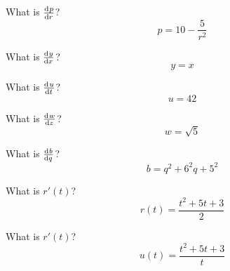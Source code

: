 \begin{ProblemSet}
 \begin{Problem}
  What is $\frac{\mathrm{d}^{{}}p}{\mathrm{d} r^{{}}}$?
  \begin{equation*}
   p = 10 - \frac{5}{r^2}
  \end{equation*}
 \end{Problem}

 \begin{Problem}
  What is $\frac{\mathrm{d}^{{}}y}{\mathrm{d} x^{{}}}$?
  \begin{equation*}
   y = x
  \end{equation*}
 \end{Problem}

 \begin{Problem}
  What is $\frac{\mathrm{d}^{{}}u}{\mathrm{d} t^{{}}}$?
  \begin{equation*}
   u = 42
  \end{equation*}
 \end{Problem}

 \begin{Problem}
  What is $\frac{\mathrm{d}^{{}}w}{\mathrm{d} z^{{}}}$?
  \begin{equation*}
   w = \sqrt{5}
  \end{equation*}
 \end{Problem}

 \begin{Problem}
  What is $\frac{\mathrm{d}^{{}}b}{\mathrm{d} q^{{}}}$?
  \begin{equation*}
   b = q^2 + 6^2 q + 5^2
  \end{equation*}
 \end{Problem}

 \begin{Problem}
  What is $r'(t)$?
  \begin{equation*}
   r(t) = \frac{t^2 + 5 t + 3}{2}
  \end{equation*}
 \end{Problem}

  \begin{Problem}
  What is $r'(t)$?
  \begin{equation*}
   u(t) = \frac{t^2 + 5 t + 3}{t}
  \end{equation*}
 \end{Problem}

\end{ProblemSet}

